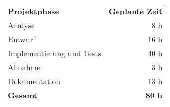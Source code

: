 \begin{tabular}{lr}
\rowcolor{heading}\textbf{Projektphase} & \textbf{Geplante Zeit} \\
Analyse & 8 h \\
\rowcolor{odd}Entwurf & 16 h \\
Implementierung und Tests & 40 h \\
\rowcolor{odd}Abnahme & 3 h \\
Dokumentation & 13 h \\
\hline
\hline
\rowcolor{odd}\textbf{Gesamt} & \textbf{80 h} \\
\end{tabular}